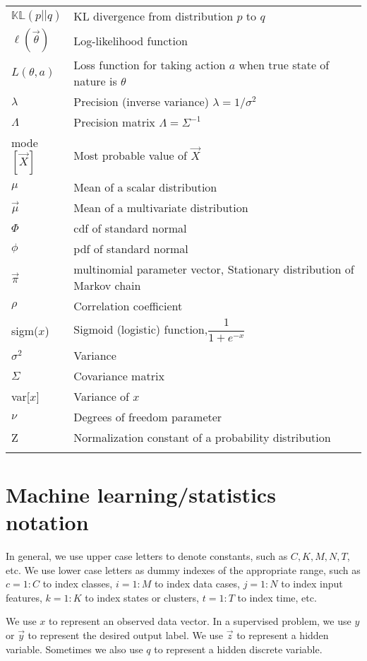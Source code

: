 \begin{longtable}{ll}
$\mathbb{KL}(p||q)$ & KL divergence from distribution $p$ to $q$\\
$\ell(\vec{\theta})$ & Log-likelihood function\\
$L(\theta,a)$ & Loss function for taking action $a$ when true state of nature is $\theta$\\
$\lambda$ & Precision (inverse variance) $\lambda=1/\sigma^2$\\
$\Lambda$ & Precision matrix $\Lambda=\Sigma^{-1}$\\
mode$[\vec X]$ & Most probable value of $\vec X$\\
$\mu$ & Mean of a scalar distribution\\
$\vec{\mu}$ & Mean of a multivariate distribution\\
$\Phi$ & cdf of standard normal\\
$\phi$ & pdf of standard normal\\
$\vec{\pi}$ & multinomial parameter vector, Stationary distribution of Markov chain\\
$\rho$ & Correlation coefficient \\
sigm($x$) & Sigmoid (logistic) function,$\dfrac{1}{1+e^{-x}}$\\
$\sigma^2$ & Variance\\
$\Sigma$ & Covariance matrix\\
var[$x$] & Variance of $x$\\
$\nu$ & Degrees of freedom parameter\\
Z & Normalization constant of a probability distribution\\
\noalign{\smallskip}\hline\noalign{\smallskip}
\end{longtable}

\section*{Machine learning/statistics notation}
In general, we use upper case letters to denote constants, such as $C, K, M, N, T$, etc. We use lower case letters as dummy indexes of the appropriate range, such as $c=1:C$ to index classes, $i=1:M$ to index data cases, $j=1:N$ to index input features, $k=1:K$ to index states or clusters, $t=1:T$ to index time, etc.

We use $x$ to represent an observed data vector. In a supervised problem, we use $y$ or $\vec{y}$ to represent the desired output label. We use $\vec{z}$ to represent a hidden variable. Sometimes we also use $q$ to represent a hidden discrete variable.

